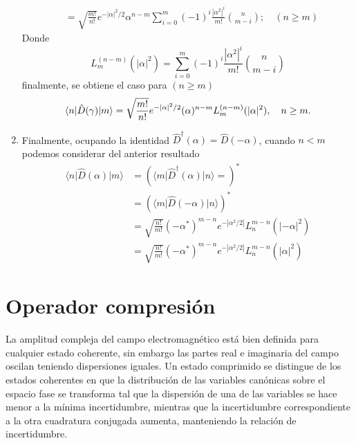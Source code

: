 \begin{enumerate}
\begin{align}
                                                          & = \sqrt{\frac{m!}{n!}} e^{-|\alpha|^2/2} \alpha^{n-m} \sum_{i=0}^{m}(-1)^{i} \frac{|\alpha^2|^{i}}{m!} \binom{n}{m-i} ; \quad (n\geq m)
        \end{align}
        Donde
        \begin{equation}
          L_m^{(n-m)}(|\alpha|^2) = \sum_{i=0}^{m}(-1)^{i} \frac{|\alpha^2|^{i}}{m!} \binom{n}{m-i}
        \end{equation}
        finalmente, se obtiene el caso para $(n\geq m)$
        \begin{equation}
          \langle n \vert \hat{D}(\gamma) \vert m \rangle = \sqrt{\frac{m!}{n!}}e^{-|\alpha|^2/2}(\alpha)^{n-m}L_m^{(n-m)}(|\alpha|^2),\quad n\geq m.                                                                \\
        \end{equation}

  \item Finalmente, ocupando la identidad $\hat{D}^\dagger(\alpha) = \hat{D}(-\alpha)$, cuando $n<m$ podemos considerar del anterior resultado
        \begin{align}
          \langle n \vert \hat{D}(\alpha)\vert m\rangle & = \left( \langle m \vert \hat{D}^\dagger (\alpha) \vert n\rangle = \right)^{*}   \\
                                                        & = \left( \langle m \vert \hat{D}(-\alpha) \vert n\rangle \right)^{*}             \\
                                                        & = \sqrt{\frac{n!}{m!}}(-\alpha^*)^{m-n} e^{-|\alpha^2/2|}L_n^{m-n} (|-\alpha|^2) \\
                                                        & = \sqrt{\frac{n!}{m!}}(-\alpha^*)^{m-n} e^{-|\alpha^2/2|}L_n^{m-n} (|\alpha|^2)
        \end{align}
\end{enumerate}

\section{Operador compresión}

La amplitud compleja del campo electromagnético está bien definida para cualquier estado coherente, sin embargo las partes real e imaginaria del campo oscilan teniendo dispersiones iguales. Un estado comprimido se distingue de los estados coherentes en que la distribución de las variables canónicas sobre el espacio fase se transforma tal que la dispersión de una de las variables se hace menor a la mínima incertidumbre, mientras que la incertidumbre correspondiente a la otra cuadratura conjugada aumenta, manteniendo la relación de incertidumbre.

